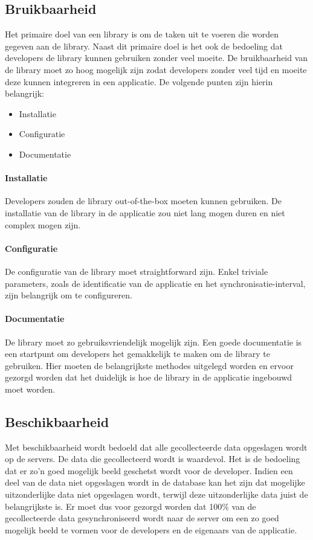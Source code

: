 \subsection{Bruikbaarheid}
Het primaire doel van een library is om de taken uit te voeren die worden gegeven aan de library. Naast dit primaire doel is het ook de bedoeling dat developers de library kunnen gebruiken zonder veel moeite. De bruikbaarheid van de library moet zo hoog mogelijk zijn zodat developers zonder veel tijd en moeite deze kunnen integreren in een applicatie. De volgende punten zijn hierin belangrijk: 
\begin{itemize}
\item Installatie
\item Configuratie
\item Documentatie
\end{itemize}

\paragraph{Installatie} Developers zouden de library out-of-the-box moeten kunnen gebruiken. De installatie van de library in de applicatie zou niet lang mogen duren en niet complex mogen zijn. \\

\paragraph{Configuratie} De configuratie van de library moet straightforward zijn. Enkel triviale parameters, zoals de identificatie van de applicatie en het synchronisatie-interval, zijn belangrijk om te configureren. \\

\paragraph{Documentatie} De library moet zo gebruiksvriendelijk mogelijk zijn. Een goede documentatie is een startpunt om developers het gemakkelijk te maken om de library te gebruiken. Hier moeten de belangrijkste methodes uitgelegd worden en ervoor gezorgd worden dat het duidelijk is hoe de library in de applicatie ingebouwd moet worden. 



\subsection{Beschikbaarheid}
Met beschikbaarheid wordt bedoeld dat alle gecollecteerde data opgeslagen wordt op de servers. De data die gecollecteerd wordt is waardevol. Het is de bedoeling dat er zo'n goed mogelijk beeld geschetst wordt voor de developer. Indien een deel van de data niet opgeslagen wordt in de database kan het zijn dat mogelijke uitzonderlijke data niet opgeslagen wordt, terwijl deze uitzonderlijke data juist de belangrijkste is. Er moet dus voor gezorgd worden dat 100\% van de gecollecteerde data gesynchroniseerd wordt naar de server om een zo goed mogelijk beeld te vormen voor de developers en de eigenaars van de applicatie.\\


